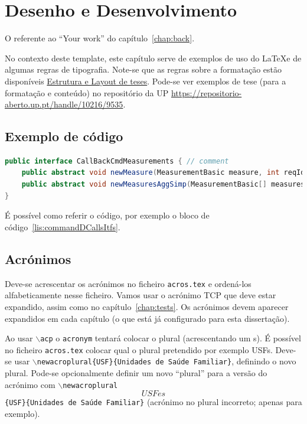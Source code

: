 \chapter{Desenho e Desenvolvimento}\label{chap:devel}

O referente ao ``Your work'' do capítulo~\ref{chap:back}.

No contexto deste template, este capítulo serve de exemplos de uso do \LaTeX e de algumas regras de tipografia. Note-se que as regras sobre a formatação estão disponíveis \href{https://sigarra.up.pt/fcup/pt/conteudos_geral.ver?pct_pag_id=1011511&pct_parametros=pv_unidade=97&pct_grupo=33673&pct_grupo=33670&pct_grupo=33675&pct_grupo=33683&pct_grupo=36711#36711}{Estrutura e Layout de teses}. Pode-se ver exemplos de tese (para a formatação e conteúdo) no repositório da UP \url{https://repositorio-aberto.up.pt/handle/10216/9535}.

\section{Exemplo de código}

\begin{lstlisting}[numbers=none,language=java,caption={[CommandDaemonCallsItf]
   {CommandDaemon} callback interfaces},label=lis:commandDCallsItfs,float=htb]
public interface CallBackCmdMeasurements { // comment
	public abstract void newMeasure(MeasurementBasic measure, int reqId);
	public abstract void newMeasuresAggSimp(MeasurementBasic[] measuresAggSimp, 'A string');
}
\end{lstlisting}

É possível como referir o código, por exemplo o bloco de código~\ref{lis:commandDCallsItfs}.

\section{Acrónimos}

Deve-se acrescentar os acrónimos no ficheiro \texttt{acros.tex} e ordená-los 
alfabeticamente nesse ficheiro.
Vamos usar o acrónimo \ac{TCP} que deve estar expandido, assim como no 
capítulo~\ref{chap:tests}. Os acrónimos devem aparecer expandidos em cada 
capítulo (o que está já configurado para esta dissertação).

Ao usar $\backslash$\texttt{acp} o \texttt{acronym} tentará colocar o plural 
(acrescentando um s). É possível no ficheiro \texttt{acros.tex} colocar qual o 
plural pretendido por exemplo \acp{USF}. Deve-se usar 
$\backslash$\texttt{newacroplural\{USF\}\{Unidades de Saúde Familiar\}}, 
definindo o novo plural. Pode-se opcionalmente definir um novo ``plural'' para a 
versão do acrónimo com 
$\backslash$\texttt{newacroplural\[USFes\]\{USF\}\{Unidades de Saúde Familiar\}} 
(acrónimo no plural incorreto; apenas para exemplo).


